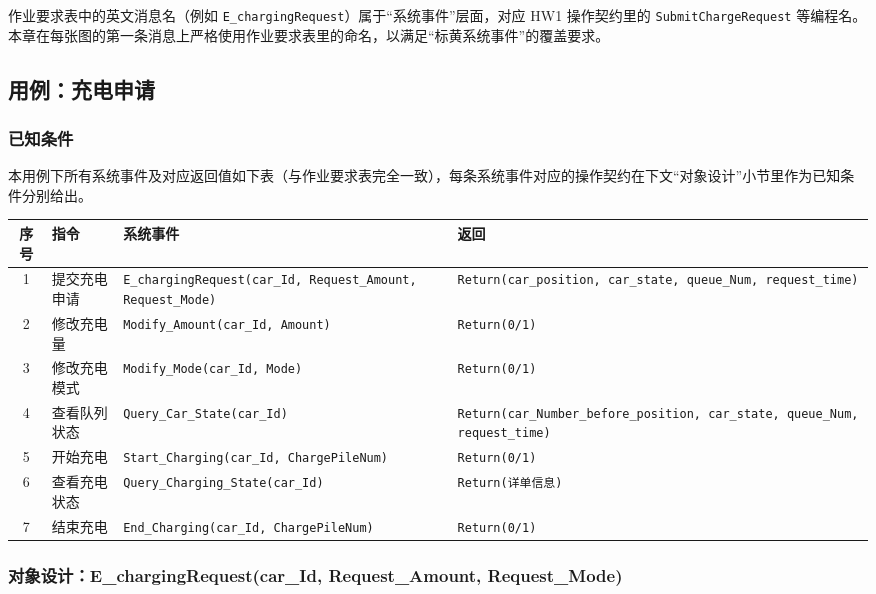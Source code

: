 \documentclass[a4paper,11pt]{ctexart}
\begin{document}
作业要求表中的英文消息名（例如 \texttt{E\_chargingRequest}）属于``系统事件''层面，对应 HW1 操作契约里的 \texttt{SubmitChargeRequest} 等编程名。本章在每张图的第一条消息上严格使用作业要求表里的命名，以满足``标黄系统事件''的覆盖要求。

\clearpage
\subsection{用例：充电申请}

\subsubsection{已知条件}

本用例下所有系统事件及对应返回值如下表（与作业要求表完全一致），每条系统事件对应的操作契约在下文``对象设计''小节里作为已知条件分别给出。

\begin{longtable}{cp{2.4cm}p{6.2cm}p{5.6cm}}
\toprule
\textbf{序号} & \textbf{指令} & \textbf{系统事件} & \textbf{返回} \\
\midrule
\endhead
1 & 提交充电申请 & \texttt{E\_chargingRequest(car\_Id, Request\_Amount, Request\_Mode)} & \texttt{Return(car\_position, car\_state, queue\_Num, request\_time)} \\
2 & 修改充电量 & \texttt{Modify\_Amount(car\_Id, Amount)} & \texttt{Return(0/1)} \\
3 & 修改充电模式 & \texttt{Modify\_Mode(car\_Id, Mode)} & \texttt{Return(0/1)} \\
4 & 查看队列状态 & \texttt{Query\_Car\_State(car\_Id)} & \texttt{Return(car\_Number\_before\_position, car\_state, queue\_Num, request\_time)} \\
5 & 开始充电 & \texttt{Start\_Charging(car\_Id, ChargePileNum)} & \texttt{Return(0/1)} \\
6 & 查看充电状态 & \texttt{Query\_Charging\_State(car\_Id)} & \texttt{Return(详单信息)} \\
7 & 结束充电 & \texttt{End\_Charging(car\_Id, ChargePileNum)} & \texttt{Return(0/1)} \\
\bottomrule
\end{longtable}

\subsubsection{对象设计：E\_chargingRequest(car\_Id, Request\_Amount, Request\_Mode)}
\end{document}
